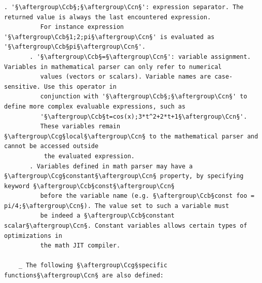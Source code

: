 \documentclass[a4paper,10.5pt,twoside]{book}
\def\Ccb{\color{cb}}
\def\Ccg{\color{cc}}
\def\Ccn{\color{black}}
\begin{document}
\begin{lstlisting}[escapechar=§]
       . '§\aftergroup\Ccb§;§\aftergroup\Ccn§': expression separator. The returned value is always the last encountered expression. 
          For instance expression '§\aftergroup\Ccb§1;2;pi§\aftergroup\Ccn§' is evaluated as '§\aftergroup\Ccb§pi§\aftergroup\Ccn§'. 
       . '§\aftergroup\Ccb§=§\aftergroup\Ccn§': variable assignment. Variables in mathematical parser can only refer to numerical 
          values (vectors or scalars). Variable names are case-sensitive. Use this operator in 
          conjunction with '§\aftergroup\Ccb§;§\aftergroup\Ccn§' to define more complex evaluable expressions, such as 
          '§\aftergroup\Ccb§t=cos(x);3*t^2+2*t+1§\aftergroup\Ccn§'. 
          These variables remain §\aftergroup\Ccg§local§\aftergroup\Ccn§ to the mathematical parser and cannot be accessed outside 
           the evaluated expression. 
       . Variables defined in math parser may have a §\aftergroup\Ccg§constant§\aftergroup\Ccn§ property, by specifying keyword §\aftergroup\Ccb§const§\aftergroup\Ccn§ 
          before the variable name (e.g. §\aftergroup\Ccb§const foo = pi/4;§\aftergroup\Ccn§). The value set to such a variable must 
          be indeed a §\aftergroup\Ccb§constant scalar§\aftergroup\Ccn§. Constant variables allows certain types of optimizations in 
          the math JIT compiler. 
 
    _ The following §\aftergroup\Ccg§specific functions§\aftergroup\Ccn§ are also defined: 
 

\end{lstlisting}
\end{document}
